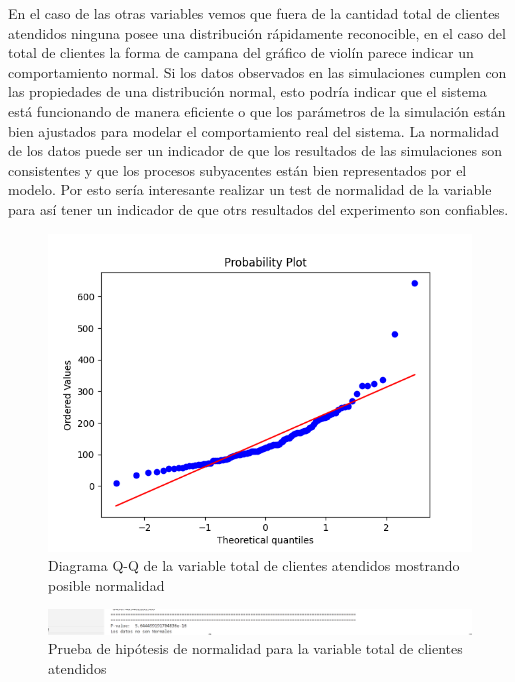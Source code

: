 \documentclass[12pt]{article}
\begin{document}
En el caso de las otras variables vemos que fuera de la cantidad total de clientes atendidos ninguna posee una distribución rápidamente reconocible, en el caso del total de clientes la forma de campana del gráfico de violín parece indicar un comportamiento normal. Si los datos observados en las simulaciones cumplen con las propiedades de una distribución normal, esto podría indicar que el sistema está funcionando de manera eficiente o que los parámetros de la simulación están bien ajustados para modelar el comportamiento real del sistema. La normalidad de los datos puede ser un indicador de que los resultados de las simulaciones son consistentes y que los procesos subyacentes están bien representados por el modelo. Por esto sería interesante realizar un test de normalidad de la variable para así tener un indicador de que otrs resultados del experimento son confiables.

\begin{figure}[H]
\centering
\includegraphics[width=1.2\textwidth]{normal.png}
\caption{Diagrama Q-Q de la variable total de clientes atendidos mostrando posible normalidad}
\end{figure}

\begin{figure}[H]
\centering
\includegraphics[width=1.2\textwidth]{normal-test.png}
\caption{Prueba de hipótesis de normalidad para la variable total de clientes atendidos}
\end{figure}
\end{document}
